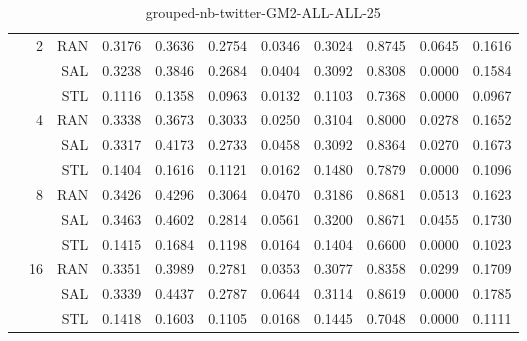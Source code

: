 \begin{center}
\begin{table}[htbp]
\begin{center}
\begin{tabular}{ | r | r | r | r | r | r | r | r | r | r | r |}
 & \multirow{3}{*}{2} & RAN & 0.3176 & 0.3636 & 0.2754 & 0.0346 & 0.3024 & 0.8745 & 0.0645 & 0.1616\\ \cline{3-11}
 &   & SAL & 0.3238 & 0.3846 & 0.2684 & 0.0404 & 0.3092 & 0.8308 & 0.0000 & 0.1584\\ \cline{3-11}
 &   & STL & 0.1116 & 0.1358 & 0.0963 & 0.0132 & 0.1103 & 0.7368 & 0.0000 & 0.0967\\ \cline{2-11}
 & \multirow{3}{*}{4} & RAN & 0.3338 & 0.3673 & 0.3033 & 0.0250 & 0.3104 & 0.8000 & 0.0278 & 0.1652\\ \cline{3-11}
 &   & SAL & 0.3317 & 0.4173 & 0.2733 & 0.0458 & 0.3092 & 0.8364 & 0.0270 & 0.1673\\ \cline{3-11}
 &   & STL & 0.1404 & 0.1616 & 0.1121 & 0.0162 & 0.1480 & 0.7879 & 0.0000 & 0.1096\\ \cline{2-11}
 & \multirow{3}{*}{8} & RAN & 0.3426 & 0.4296 & 0.3064 & 0.0470 & 0.3186 & 0.8681 & 0.0513 & 0.1623\\ \cline{3-11}
 &   & SAL & 0.3463 & 0.4602 & 0.2814 & 0.0561 & 0.3200 & 0.8671 & 0.0455 & 0.1730\\ \cline{3-11}
 &   & STL & 0.1415 & 0.1684 & 0.1198 & 0.0164 & 0.1404 & 0.6600 & 0.0000 & 0.1023\\ \cline{2-11}
 & \multirow{3}{*}{16} & RAN & 0.3351 & 0.3989 & 0.2781 & 0.0353 & 0.3077 & 0.8358 & 0.0299 & 0.1709\\ \cline{3-11}
 &   & SAL & 0.3339 & 0.4437 & 0.2787 & 0.0644 & 0.3114 & 0.8619 & 0.0000 & 0.1785\\ \cline{3-11}
 &   & STL & 0.1418 & 0.1603 & 0.1105 & 0.0168 & 0.1445 & 0.7048 & 0.0000 & 0.1111\\ \cline{2-11}
\hline
\end{tabular}
\caption{grouped-nb-twitter-GM2-ALL-ALL-25}
\end{center}
 \end{table}
\end{center}


